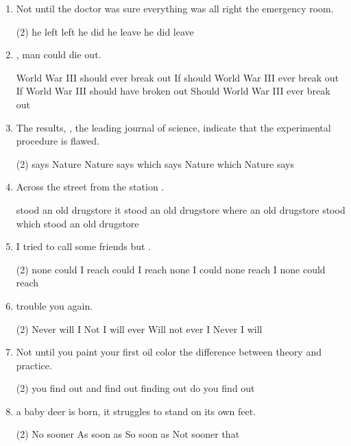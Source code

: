 \begin{enumerate}
\item Not until the doctor was sure everything was all right \ttu the emergency room.
\begin{tasks}(2)
  \task he left
  \task left he
  \task did he leave
  \task he did leave
\end{tasks}

\item \ttu, man could die out.
\begin{tasks}
  \task World War III should ever break out
  \task If should World War III ever break out
  \task If World War III should have broken out
  \task Should World War III ever break out
\end{tasks}

\item The results, \ttu, the leading journal of science, indicate that the experimental procedure is flawed.
\begin{tasks}(2)
  \task says Nature
  \task Nature says
  \task which says Nature
  \task which Nature says
\end{tasks}

\item Across the street from the station \ttu.
\begin{tasks}
  \task stood an old drugstore
  \task it stood an old drugstore
  \task where an old drugstore stood
  \task which stood an old drugstore
\end{tasks}

\item I tried to call some friends but \ttu.
\begin{tasks}(2)
  \task none could I reach
  \task could I reach none
  \task I could none reach
  \task I none could reach
\end{tasks}

\item \ttu trouble you again.
\begin{tasks}(2)
  \task Never will I
  \task Not I will ever
  \task Will not ever I
  \task Never I will
\end{tasks}

\item Not until you paint your first oil color \ttu the difference between
  theory and practice.
\begin{tasks}(2)
  \task you find out
  \task and find out
  \task finding out
  \task do you find out
\end{tasks}

\item \ttu a baby deer is born, it struggles to stand on its own feet.
\begin{tasks}(2)
  \task No sooner
  \task As soon as
  \task So soon as
  \task Not sooner that
\end{tasks}


\end{enumerate}
